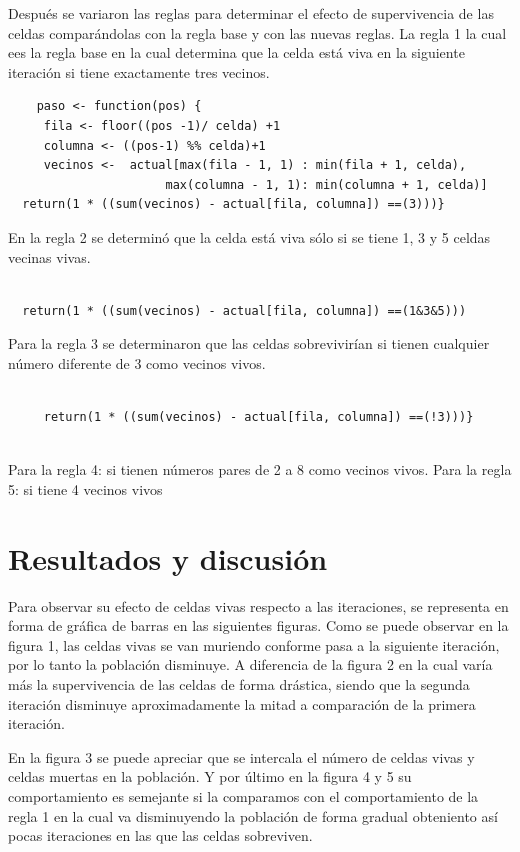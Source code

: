 \documentclass[12pt]{amsart}
\begin{document}
Después se variaron las reglas para determinar el efecto de supervivencia de las celdas comparándolas con la regla base y con las nuevas reglas.
La regla 1 la cual ees la regla base en la cual determina que la celda está viva en la siguiente iteración si tiene exactamente tres vecinos.

\begin{lstlisting}
    paso <- function(pos) {
     fila <- floor((pos -1)/ celda) +1
     columna <- ((pos-1) %% celda)+1
     vecinos <-  actual[max(fila - 1, 1) : min(fila + 1, celda),
                      max(columna - 1, 1): min(columna + 1, celda)]
  return(1 * ((sum(vecinos) - actual[fila, columna]) ==(3)))}
\end{lstlisting}

En la regla 2 se determinó que la celda está viva sólo si se tiene 1, 3 y 5 celdas vecinas vivas.
\begin{lstlisting}

  return(1 * ((sum(vecinos) - actual[fila, columna]) ==(1&3&5)))
\end{lstlisting}
\newpage
\bigskip 
\bigskip
\bigskip
Para la regla 3 se determinaron que las celdas sobrevivirían si tienen cualquier número diferente de 3 como vecinos vivos.

\begin{lstlisting}

     return(1 * ((sum(vecinos) - actual[fila, columna]) ==(!3)))}
     
\end{lstlisting}

Para la regla 4: si tienen números pares de 2 a 8 como vecinos vivos.
Para la regla 5: si tiene 4 vecinos vivos

\bigskip

\section{Resultados y discusión}
Para observar su efecto de celdas vivas respecto a las iteraciones, se representa en forma de gráfica de barras en las siguientes figuras. Como se puede observar en la figura 1, las celdas vivas se van muriendo conforme pasa a la siguiente iteración, por lo tanto la población disminuye. A diferencia de la figura 2 en la cual varía más la supervivencia de las celdas de forma drástica, siendo que la segunda iteración disminuye aproximadamente la mitad a comparación de la primera iteración.

En la figura 3 se puede apreciar que se intercala el número de celdas vivas y celdas muertas en la población. Y por último en la figura 4 y 5 su comportamiento es semejante si la comparamos con el comportamiento de la regla 1 en la cual va disminuyendo la población de forma gradual obteniento así pocas iteraciones en las que las celdas sobreviven.
\end{document}

